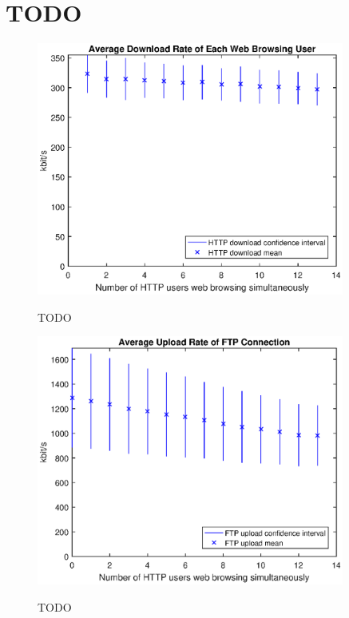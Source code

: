 \documentclass[a4paper,10pt]{book}\usepackage{graphicx}
\begin{document}
\section{TODO}
\begin{figure}[!ht]
  \centering
    \includegraphics[width=0.9\textwidth]{on_http_download.eps}
    \label{fig:on_http_download}
    \caption{TODO}
\end{figure}

\begin{figure}[!ht]
  \centering
    \includegraphics[width=0.9\textwidth]{on_ftp_upload.eps}
    \label{fig:on_ftp_upload}
    \caption{TODO}
\end{figure}
\end{document}
